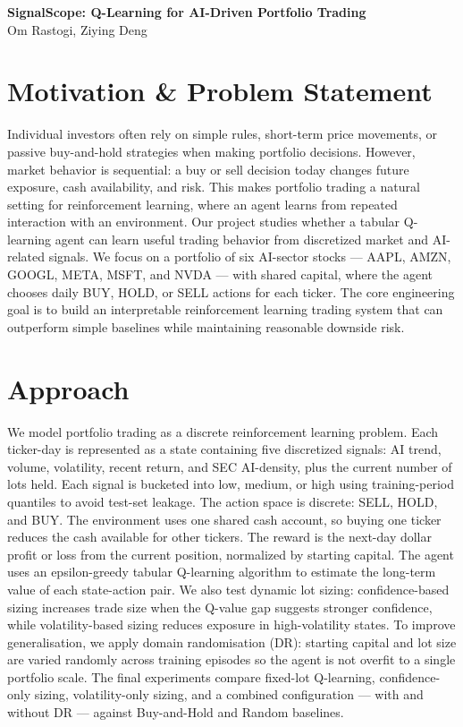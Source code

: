 \documentclass[10pt]{article}
\begin{document}
\begin{center}
    {\Large \textbf{SignalScope: Q-Learning for AI-Driven Portfolio Trading}}\\
    \vspace{0.25em}
    Om Rastogi, Ziying Deng
\end{center}

\section{Motivation \& Problem Statement}

Individual investors often rely on simple rules, short-term price movements, or passive buy-and-hold strategies when making portfolio decisions. However, market behavior is sequential: a buy or sell decision today changes future exposure, cash availability, and risk. This makes portfolio trading a natural setting for reinforcement learning, where an agent learns from repeated interaction with an environment. Our project studies whether a tabular Q-learning agent can learn useful trading behavior from discretized market and AI-related signals. We focus on a portfolio of six AI-sector stocks --- AAPL, AMZN, GOOGL, META, MSFT, and NVDA --- with shared capital, where the agent chooses daily BUY, HOLD, or SELL actions for each ticker. The core engineering goal is to build an interpretable reinforcement learning trading system that can outperform simple baselines while maintaining reasonable downside risk.

\section{Approach}

We model portfolio trading as a discrete reinforcement learning problem. Each ticker-day is represented as a state containing five discretized signals: AI trend, volume, volatility, recent return, and SEC AI-density, plus the current number of lots held. Each signal is bucketed into low, medium, or high using training-period quantiles to avoid test-set leakage. The action space is discrete: SELL, HOLD, and BUY. The environment uses one shared cash account, so buying one ticker reduces the cash available for other tickers. The reward is the next-day dollar profit or loss from the current position, normalized by starting capital. The agent uses an epsilon-greedy tabular Q-learning algorithm to estimate the long-term value of each state-action pair. We also test dynamic lot sizing: confidence-based sizing increases trade size when the Q-value gap suggests stronger confidence, while volatility-based sizing reduces exposure in high-volatility states. To improve generalisation, we apply domain randomisation (DR): starting capital and lot size are varied randomly across training episodes so the agent is not overfit to a single portfolio scale. The final experiments compare fixed-lot Q-learning, confidence-only sizing, volatility-only sizing, and a combined configuration --- with and without DR --- against Buy-and-Hold and Random baselines.
\end{document}
